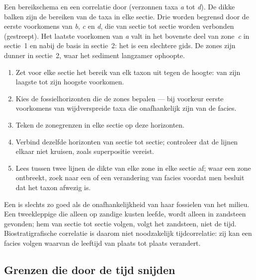 \begin{omfigure}
{\small Een bereikschema en een correlatie door  (verzonnen taxa \emph{a} tot \emph{d}). De dikke balken zijn de bereiken van de taxa in elke sectie. Drie  worden begrensd door de eerste voorkomens van \emph{b}, \emph{c} en \emph{d}, die van sectie tot sectie worden verbonden (gestreept). Het laatste voorkomen van \emph{a} valt in het bovenste deel van zone~\emph{c} in sectie~1 en nabij de basis in sectie~2: het is een slechtere gids. De zones zijn dunner in sectie~2, waar het sediment langzamer ophoopte.}
\label{fig:b1:stratigraphic-scale:range-chart}
\end{omfigure}

\begin{method}\label{met:b1:stratigraphic-scale:biozones}
\begin{enumerate}
  \item Zet voor elke sectie het bereik van elk taxon uit tegen de hoogte: van zijn laagste tot zijn hoogste voorkomen.
  \item Kies de fossielhorizonten die de zones bepalen --- bij voorkeur eerste voorkomens van wijdverspreide taxa die onafhankelijk zijn van de facies.
  \item Teken de zonegrenzen in elke sectie op deze horizonten.
  \item Verbind dezelfde horizonten van sectie tot sectie; controleer dat de lijnen elkaar niet kruisen, zoals superpositie vereist.
  \item Lees tussen twee lijnen de dikte van elke zone in elke sectie af; waar een zone ontbreekt, zoek naar een  of een verandering van facies voordat men besluit dat het taxon afwezig is.
\end{enumerate}
\end{method}

Een  is slechts zo goed als de onafhankelijkheid van haar fossielen van het milieu. Een tweekleppige die alleen op zandige kusten leefde, wordt alleen in zandsteen gevonden; hem van sectie tot sectie volgen, volgt het zandsteen, niet de tijd. Biostratigrafische correlatie is daarom niet noodzakelijk tijdcorrelatie: zij kan een facies volgen waarvan de leeftijd van plaats tot plaats verandert.

\subsection*{Grenzen die door de tijd snijden}

